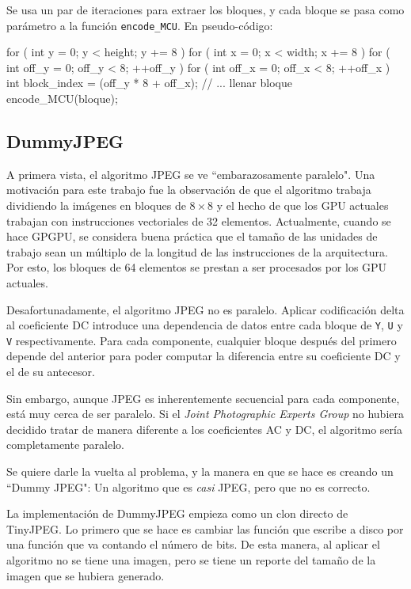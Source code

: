 Se usa un par de iteraciones para extraer los bloques, y cada bloque se pasa como
parámetro a la función \verb+encode_MCU+. En pseudo-código:

\begin{code}[language=C][h]
    for ( int y = 0; y < height; y += 8 ) {
        for ( int x = 0; x < width; x += 8 ) {
            for ( int off_y = 0; off_y < 8; ++off_y ) {
                for ( int off_x = 0; off_x < 8; ++off_x ) {
                    int block_index = (off_y * 8 + off_x);
                    // ... llenar bloque
                }
            }
            encode_MCU(bloque);
        }
    }
\end{code}

\subsection{DummyJPEG} \label{sub:dummy}

A primera vista, el algoritmo JPEG se ve ``embarazosamente paralelo". Una
motivación para este trabajo fue la observación de que el algoritmo trabaja
dividiendo la imágenes en bloques de $8\times8$ y el hecho de que los GPU
actuales trabajan con instrucciones vectoriales de 32 elementos. Actualmente,
cuando se hace \gls{GPGPU}, se considera buena práctica que el tamaño de las
unidades de trabajo sean un múltiplo de la longitud de las instrucciones de la
arquitectura. Por esto, los bloques de 64 elementos se prestan a ser procesados
por los GPU actuales.

Desafortunadamente, el algoritmo JPEG no es paralelo. Aplicar codificación
delta al coeficiente DC introduce una dependencia de datos entre cada bloque de
\verb+Y+, \verb+U+ y \verb+V+ respectivamente. Para cada componente, cualquier
bloque después del primero depende del anterior para poder computar la
diferencia entre su coeficiente DC  y el de su antecesor.

Sin embargo, aunque JPEG es inherentemente secuencial para cada componente,
está muy cerca de ser paralelo. Si el \emph{Joint Photographic Experts Group}
no hubiera decidido tratar de manera diferente a los \gls{coeficientes AC} y DC, el
algoritmo sería completamente paralelo.

Se quiere darle la vuelta al problema, y la manera en que se hace es creando
un ``Dummy JPEG": Un algoritmo que es \emph{casi} JPEG, pero que no es correcto.

La implementación de DummyJPEG empieza como un clon directo de TinyJPEG. Lo
primero que se hace es cambiar las función que escribe a disco por una función
que va contando el número de bits. De esta manera, al aplicar el algoritmo no
se tiene una imagen, pero se tiene un reporte del tamaño de la imagen que
se hubiera generado.

